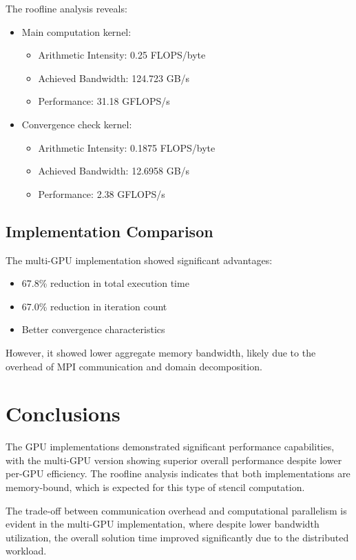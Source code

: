 \documentclass{article}
\begin{document}
The roofline analysis reveals:
\begin{itemize}
    \item Main computation kernel:
    \begin{itemize}
        \item Arithmetic Intensity: 0.25 FLOPS/byte
        \item Achieved Bandwidth: 124.723 GB/s
        \item Performance: 31.18 GFLOPS/s
    \end{itemize}
    \item Convergence check kernel:
    \begin{itemize}
        \item Arithmetic Intensity: 0.1875 FLOPS/byte
        \item Achieved Bandwidth: 12.6958 GB/s
        \item Performance: 2.38 GFLOPS/s
    \end{itemize}
\end{itemize}

\subsection{Implementation Comparison}

The multi-GPU implementation showed significant advantages:
\begin{itemize}
    \item 67.8\% reduction in total execution time
    \item 67.0\% reduction in iteration count
    \item Better convergence characteristics
\end{itemize}

However, it showed lower aggregate memory bandwidth, likely due to the overhead of MPI communication and domain decomposition.

\section{Conclusions}

The GPU implementations demonstrated significant performance capabilities, with the multi-GPU version showing superior overall performance despite lower per-GPU efficiency. The roofline analysis indicates that both implementations are memory-bound, which is expected for this type of stencil computation.

The trade-off between communication overhead and computational parallelism is evident in the multi-GPU implementation, where despite lower bandwidth utilization, the overall solution time improved significantly due to the distributed workload.
\end{document}
